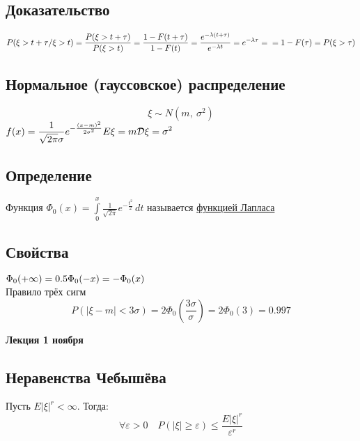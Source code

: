 \documentclass[12pt, a4paper]{article}
\begin{document}
    \subsection*{Доказательство}
    $\displaystyle P(\xi > t + \tau / \xi > t) = \frac{P(\xi > t + \tau)}{P(\xi > t)} = \frac{1 - F(t + \tau)}{1 - F(t)} = \frac{e^{-\lambda(t + \tau)}}{e^{-\lambda t}} = e^{-\lambda \tau} =\\
    = 1 - F(\tau) = P(\xi > \tau)$
    \subsection*{Нормальное (гауссовское) распределение}
    \[\xi \sim N(m,\ \sigma^2)\]
    $f(x) = \displaystyle\frac{1}{\sqrt{2\pi}\sigma} e^{-\frac{(x - m)^2}{2\sigma^2}}\\
    E\xi = m\\
    \mathcal{D}\xi = \sigma^2$
    \subsection*{Определение}
    Функция $\Phi_0(x) = \displaystyle \int\limits_{0}^{x} \frac{1}{\sqrt{2\pi}}e^{-\frac{t^2}{2}}\, dt$ называется \underline{функцией Лапласа}
    \subsection*{Свойства}
    $\Phi_0 (+\infty) = 0.5\\
    \Phi_0(-x) = -\Phi_0(x)$\\
    Правило трёх сигм
    \[P(|\xi - m| < 3\sigma) = 2\Phi_0\left( \frac{3\sigma}{\sigma} \right) = 2\Phi_0(3) = 0.997\]
    \begin{center}
        \bf Лекция 1 ноября
    \end{center}
    \subsection*{Неравенства Чебышёва}
    Пусть $E|\xi|^r < \infty$. Тогда:
    \[\forall \varepsilon > 0\quad P(|\xi| \geq \varepsilon) \leq \frac{E|\xi|^r}{\varepsilon^r}\]
\end{document}

